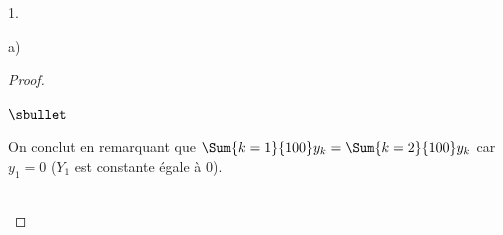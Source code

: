 \documentclass[11pt]{article}%
\begin{document}
\begin{noliste}{1.}
\begin{noliste}{a)}
\begin{proof}
\begin{noliste}{$\sbullet$}
      \item On conclut en remarquant que $\Sum{k=1}{100} y_k =
        \Sum{k=2}{100} y_k$ car $y_1 = 0$ ($Y_1$ est constante égale à
        $0$).
      \end{noliste}
      ~\\[-1.4cm]
    \end{proof}
  \end{noliste}
\end{noliste}


\end{document}
